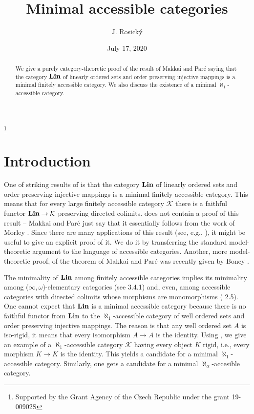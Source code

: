 \documentclass[12pt]{amsart}
\date{July 17, 2020}
\newcommand\Lin{\operatorname{\bf Lin}}
\newcommand\ck{\mathcal {K}}
\begin{document}
\title[Minimal accessible categories]
{Minimal accessible categories}
\author[J. Rosick\'{y}]
{J. Rosick\'{y}}
\thanks{Supported by the Grant Agency of the Czech Republic under the grant 
               19-00902S} 
\address{ 
\newline J. Rosick\'{y}\newline
Department of Mathematics and Statistics\newline
Masaryk University, Faculty of Sciences\newline
Kotl\'{a}\v{r}sk\'{a} 2, 611 37 Brno, Czech Republic\newline
rosicky@math.muni.cz
}
 
\begin{abstract}
We give a purely category-theoretic proof of the result of Makkai and Par\'e saying that the category $\Lin$ of linearly ordered
sets and order preserving injective mappings is a minimal finitely accessible category. We also discuss the existence of a minimal $\aleph_1$-accessible category.
\end{abstract} 
\keywords{}
\subjclass{}

\maketitle

\section{Introduction}
One of striking results of \cite{MP} is that the category $\Lin$ of linearly ordered sets and order preserving injective mappings
is a minimal finitely accessible category. This means that for every large finitely accessible category $\ck$ there is a faithful functor $\Lin\to\ck$ preserving directed colimits. \cite{MP} does not contain a proof of this result -- Makkai and Par\'e just
say that it essentially follows from the work of Morley \cite{M}. Since there are many applications of this result (see, e.g., \cite{LR}), it might be useful to give an explicit proof of it. We do it by transferring the standard model-theoretic argument to the language of accessible categories. Another, more model-theoretic proof, of the theorem of Makkai and Par\'e was recently given by Boney \cite{Bo}.

The minimality of $\Lin$ among finitely accessible categories implies its minimality among ($\infty,\omega$)-elementary categories (see \cite{MP} 3.4.1) and, even, among accessible categories
with directed colimits whose morphisms are monomorphisms (\cite{LR} 2.5).
One cannot expect that $\Lin$ is a minimal accessible category because there is no faithful functor from $\Lin$ to the 
$\aleph_1$-accessible category of well ordered sets and order preserving injective mappings. The reason is that any well ordered set $A$ is iso-rigid, it means that every isomorphism $A\to A$ is the identity. Using \cite{HPT}, we give an example 
of a $\aleph_1$-accessible category $\ck$ having every object $K$ rigid, i.e., every morphism $K\to K$ is the identity.
This yields a candidate for a minimal $\aleph_1$-accessible category. Similarly, one gets a candidate for a minimal 
$\aleph_\alpha$-accesible category.
\end{document}
